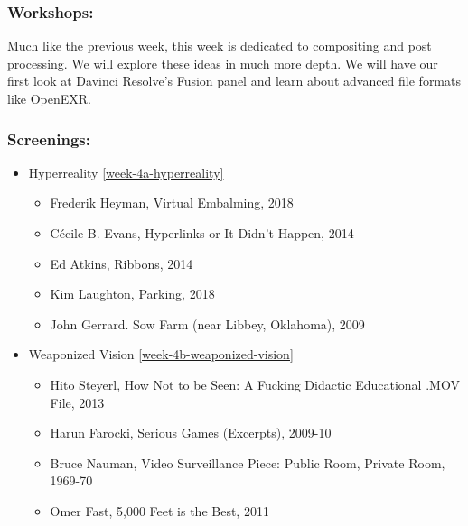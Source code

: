 \documentclass[10pt,letter,english]{article}
\begin{document}
\hypertarget{workshops-3}{%
      \subsubsection*{Workshops:}\label{workshops-3}}

Much like the previous week, this week is dedicated to compositing and post processing. We will explore these ideas in much more depth. We will have our first look at Davinci Resolve's Fusion panel and learn about advanced file formats like OpenEXR.

\subsubsection*{Screenings:}

\begin{itemize}
      \item
            Hyperreality \ref{week-4a-hyperreality}

            \begin{itemize}
                  \item
                        Frederik Heyman, Virtual Embalming, 2018
                  \item
                        Cécile B. Evans, Hyperlinks or It Didn't Happen, 2014
                  \item
                        Ed Atkins, Ribbons, 2014
                  \item
                        Kim Laughton, Parking, 2018
                  \item
                        John Gerrard. Sow Farm (near Libbey, Oklahoma), 2009
            \end{itemize}
      \item
            Weaponized Vision \ref{week-4b-weaponized-vision}

            \begin{itemize}
                  \item
                        Hito Steyerl, How Not to be Seen: A Fucking Didactic Educational .MOV File, 2013
                  \item
                        Harun Farocki, Serious Games (Excerpts), 2009-10
                  \item
                        Bruce Nauman, Video Surveillance Piece: Public Room, Private Room, 1969-70
                  \item
                        Omer Fast, 5,000 Feet is the Best, 2011
            \end{itemize}
\end{itemize}
\end{document}
